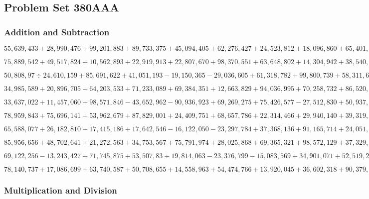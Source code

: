 \hypertarget{problem-set-380aaa}{%
\subsection{Problem Set 380AAA}\label{problem-set-380aaa}}

\hypertarget{addition-and-subtraction}{%
\subsubsection{Addition and
Subtraction}\label{addition-and-subtraction}}

\(55,639,433+28,990,476+99,201,883+89,733,375+45,094,405+62,276,427+24,523,812+18,096,860+65,401,556+91,335,679\)

\(75,889,542+49,517,824+10,562,893+22,919,913+22,807,670+98,370,551+63,648,802+14,304,942+38,540,795+87,946,815\)

\(50,808,97÷24,610,159+85,691,622+41,051,193-19,150,365-29,036,605+61,318,782+99,800,739+58,311,603-90,672,635\)

\(34,985,589+20,896,705+64,203,533+71,233,089+69,384,351+12,663,829+94,036,995+70,258,732+86,520,073+75,923,451\)

\(33,637,022+11,457,060+98,571,846-43,652,962-90,936,923+69,269,275+75,426,577-27,512,830+50,937,148-21,067,605\)

\(78,959,843+75,696,141+53,962,679+87,829,001+24,409,751+68,657,786+22,314,466+29,940,140+39,319,133+45,638,462\)

\(65,588,077+26,182,810-17,415,186+17,642,546-16,122,050-23,297,784+37,368,136+91,165,714+24,051,309-11,594,641\)

\(85,956,656+48,702,641+21,272,563+34,753,567+75,791,974+28,025,868+69,365,321+98,572,129+37,329,285+71,603,958\)

\(69,122,256-13,243,427+71,745,875+53,507,83÷19,814,063-23,376,799-15,083,569+34,901,071+52,519,202+28,245,428\)

\(78,140,737+17,086,699+63,740,587+50,708,655+14,558,963+54,474,766+13,920,045+36,602,318+90,379,532+23,980,473\)

\hypertarget{multiplication-and-division}{%
\subsubsection{Multiplication and
Division}\label{multiplication-and-division}}

